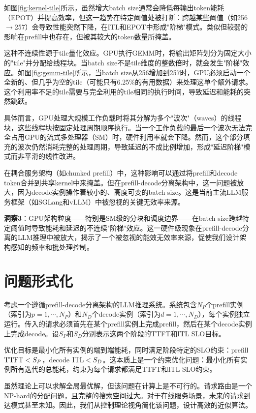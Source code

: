 如图\ref{fig:kernel-tile}所示，虽然增大batch size通常会降低每输出token能耗（EPOT）并提高效率，但这一趋势在特定阈值处被打断：跨越某些阈值（如256$\rightarrow$257）会导致性能突然下降，在ITL和EPOT中形成"阶梯"模式。类似但较弱的影响在prefill中也存在，但被其较大的token数量所掩盖。

这种不连续性源于tile量化效应。GPU执行GEMM时，将输出矩阵划分为固定大小的"tile"并分配给线程块。当batch size不是tile维度的整数倍时，就会发生"阶梯"效应。如图\ref{fig:gemm-tile}所示，当batch size从256增加到257时，GPU必须启动一个全新的、但几乎为空的tile（可能只有6.25\%的有用数据）来处理这单个额外请求。这个利用率不足的tile需要与完全利用的tile相同的执行时间，导致延迟和能耗的突然跳跃。

具体而言，GPU处理大规模工作负载时将其分解为多个"波次"（waves）的线程块，这些线程块按固定处理周期顺序执行。当一个工作负载的最后一个波次无法完全占用GPU的流式多处理器（SM）时，硬件利用率就会下降。然而，这个部分填充的波次仍然消耗完整的处理周期，导致延迟的不成比例增加，形成"延迟阶梯"模式而非平滑的线性改进。

在耦合服务架构（如chunked prefill）中，这种影响可以通过将prefill和decode token合并到共享kernel中来掩盖。但在prefill-decode分离架构中，这一问题被放大，因为decode实例操作着较小的、高度可变的batch size。这是当前主流LLM服务框架（如SGLang和vLLM）中被忽视的关键无效率来源。

\textbf{洞察3}：GPU架构粒度——特别是SM级的分块和调度边界——在batch size跨越特定阈值时导致能耗和延迟的不连续"阶梯"效应。这一硬件级现象在prefill-decode分离的LLM推理中被放大，揭示了一个被忽视的能效无效率来源，促使我们设计架构感知的频率和批处理控制。

\section{问题形式化}

考虑一个遵循prefill-decode分离架构的LLM推理系统。系统包含$N_P$个prefill实例（索引为$p=1,\cdots,N_P$）和$N_D$个decode实例（索引为$d=1,\cdots,N_D$），每个实例独立运行。传入的请求必须首先在某个prefill实例上完成prefill，然后在某个decode实例上完成decode。设$S_P$和$S_D$分别表示这两个阶段的TTFT和ITL SLO目标。

优化目标是最小化所有实例的端到端能耗，同时满足阶段特定的SLO约束：prefill $\operatorname{TTFT}<S_P$，decode $\operatorname{ITL}<S_D$。这本质上是一个约束优化问题：最小化所有实例所有迭代的总能耗，约束为每个请求都满足TTFT和ITL SLO约束。

虽然理论上可以求解全局最优解，但该问题在计算上是不可行的。请求路由是一个NP-hard的分配问题，且完整的搜索空间过大。对于在线服务场景，未来的请求到达模式甚至未知。因此，我们从控制理论视角简化该问题，设计高效的近似算法。

